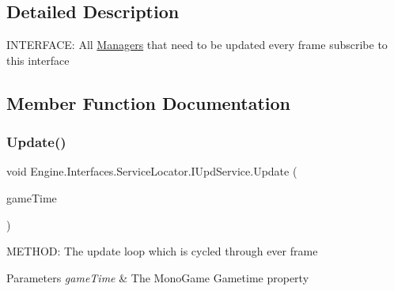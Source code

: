 \subsection{Detailed Description}
I\+N\+T\+E\+R\+F\+A\+CE\+: All \hyperlink{a00239}{Managers} that need to be updated every frame subscribe to this interface 



\subsection{Member Function Documentation}
\mbox{\label{a00478_a387fce2a5440a4dc63f8d72772ecbdaa}} 
\subsubsection{\texorpdfstring{Update()}{Update()}}
{\footnotesize\ttfamily void Engine.\+Interfaces.\+Service\+Locator.\+I\+Upd\+Service.\+Update (\begin{DoxyParamCaption}\item[{Game\+Time}]{game\+Time }\end{DoxyParamCaption})}



M\+E\+T\+H\+OD\+: The update loop which is cycled through ever frame 


\begin{DoxyParams}{Parameters}
{\em game\+Time} & The Mono\+Game Gametime property\\
\hline
\end{DoxyParams}


